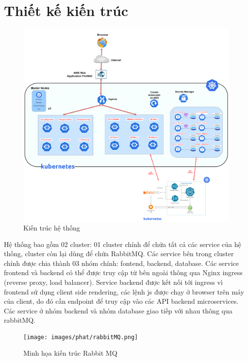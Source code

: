 \section{Thiết kế kiến trúc}
 \begin{figure}[H]
    \begin{center}
    \includegraphics[scale = 0.13]{images/phat/Release-architecture-v2}
    \vspace*{7mm}
    \end{center}

    \caption{Kiến trúc hệ thống}
    \label{fig:system-architecture-design}
\end{figure}
\noindent Hệ thống bao gồm 02 cluster: 01 cluster chính để chứa tất cả các service của hệ thống, cluster còn lại dùng để chứa RabbitMQ. Các service bên trong cluster chính được chia thành 03 nhóm chính: fontend, backend, database. Các service frontend và backend có thể được truy cập từ bên ngoài thông qua Nginx ingress (reverse proxy, load balancer). Service backend được kết nối tới ingress vì frontend sử dụng client side rendering, các lệnh js được chạy ở browser trên máy của client, do đó cần endpoint để truy cập vào các API backend microservices. Các service ở nhóm backend và nhóm database giao tiếp với nhau thông qua rabbitMQ.
\begin{figure}[H]
    \begin{center}
    \texttt{[image: images/phat/rabbitMQ.png]}
    \vspace*{7mm}
    \caption{Minh họa kiến trúc Rabbit MQ}
    \end{center}
    \label{}
\end{figure}
